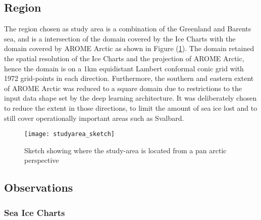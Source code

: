 \documentclass[../main/thesis.tex]{subfiles}
\begin{document}
\subsection{Region}
The region chosen as study area is a combination of the Greenland and Barents sea, and is a intersection of the domain covered by the Ice Charts \cite{Dinessen2020} with the domain covered by AROME Arctic \cite{Mueller2017} as shown in Figure (\ref{fig:studyarea-sketch}). The domain retained the spatial resolution of the Ice Charts and the projection of AROME Arctic, hence the domain is on a 1km equidistant Lambert conformal conic grid with 1972 grid-points in each direction. Furthermore, the southern and eastern extent of AROME Arctic was reduced to a square domain due to restrictions to the input data shape set by the deep learning architecture. It was deliberately chosen to reduce the extent in those directions, to limit the amount of sea ice lost and to still cover operationally important areas such as Svalbard. 

\begin{figure}
    \centering
    \texttt{[image: studyarea\_sketch]}
    \caption{\label{fig:studyarea-sketch}Sketch showing where the study-area is located from a pan arctic perspective}
\end{figure}





\subsection{Observations}

\subsubsection{Sea Ice Charts}

\begin{figure}
\end{figure}
\end{document}
